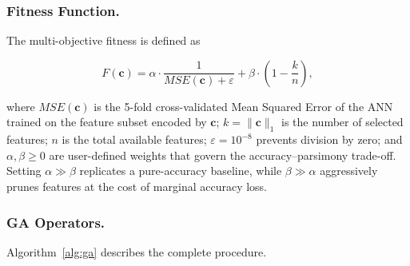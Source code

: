 \documentclass[11pt,a4paper]{article}
\begin{document}
\subsubsection{Fitness Function.}
The multi-objective fitness is defined as

\begin{equation}
F(\mathbf{c}) = \alpha \cdot \frac{1}{MSE(\mathbf{c}) + \varepsilon}
              + \beta  \cdot \left(1 - \frac{k}{n}\right),
\label{eq:fitness}
\end{equation}

where $MSE(\mathbf{c})$ is the 5-fold cross-validated Mean Squared Error
of the ANN trained on the feature subset encoded by $\mathbf{c}$;
$k = \|\mathbf{c}\|_1$ is the number of selected features;
$n$ is the total available features; $\varepsilon = 10^{-8}$ prevents
division by zero; and $\alpha, \beta \ge 0$ are user-defined weights that
govern the accuracy--parsimony trade-off. Setting $\alpha \gg \beta$
replicates a pure-accuracy baseline, while $\beta \gg \alpha$ aggressively
prunes features at the cost of marginal accuracy loss.

\subsubsection{GA Operators.}
Algorithm~\ref{alg:ga} describes the complete procedure.
\end{document}
